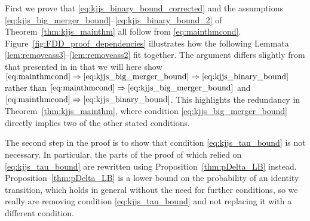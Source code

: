 First we prove that \eqref{eq:kjjs_binary_bound_corrected} and the assumptions \eqref{eq:kjjs_big_merger_bound}--\eqref{eq:kjjs_binary_bound_2} of Theorem~\ref{thm:kjjs_mainthm} all follow from \eqref{eq:mainthmcond}.
Figure~\ref{fig:FDD_proof_dependencies} illustrates how the following Lemmata \ref{lem:removeass3}--\ref{lem:removeass2} fit together. 
The argument differs slightly from that presented in \textcite{brown2021} in that we will here show $\eqref{eq:mainthmcond} \Rightarrow \eqref{eq:kjjs_big_merger_bound} \Rightarrow \eqref{eq:kjjs_binary_bound}$ rather than $\eqref{eq:mainthmcond} \Rightarrow \eqref{eq:kjjs_big_merger_bound}$ and $\eqref{eq:mainthmcond} \Rightarrow \eqref{eq:kjjs_binary_bound}$.
This highlights the redundancy in Theorem~\ref{thm:kjjs_mainthm}, where condition \eqref{eq:kjjs_big_merger_bound} directly implies two of the other stated conditions.

The second step in the proof is to show that condition \eqref{eq:kjjs_tau_bound} is not necessary. In particular, the parts of the proof of \textcite{koskela2018} which relied on \eqref{eq:kjjs_tau_bound} are rewritten using Proposition~\ref{thm:pDelta_LB} instead. 
Proposition~\ref{thm:pDelta_LB} is a lower bound on the probability of an identity transition, which holds in general without the need for further conditions, so we really are removing condition \eqref{eq:kjjs_tau_bound} and not replacing it with a different condition.


